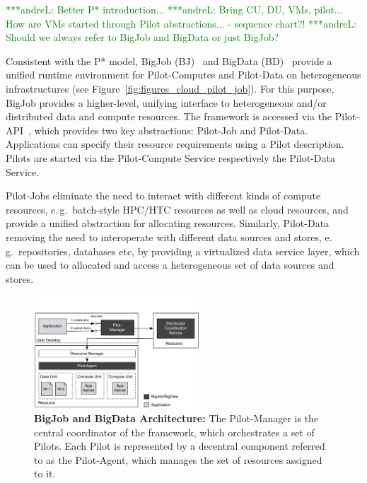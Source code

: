 \documentclass[times]{cpeauth}
\newcommand{\alnote}[1]{ {\textcolor{green} { ***andreL: #1 }}}
\newcommand{\alnote}[1]{}
\newcommand{\pilot}{Pilot\xspace}
\newcommand{\pilots}{Pilots\xspace}
\newcommand{\pilotjob}{Pilot-Job\xspace}
\newcommand{\pilotjobs}{Pilot-Jobs\xspace}
\newcommand{\pilotcomputes}{Pilot-Computes\xspace}
\newcommand{\pilotdata}{Pilot-Data\xspace}
\newcommand{\pilotdataservice}{Pilot-Data Service\xspace}
\newcommand{\pilotcomputeservice}{Pilot-Compute Service\xspace}
\newcommand{\upp}{\vspace*{-0.5em}}
\begin{document}
\alnote{Better P* introduction...}
\alnote{Bring CU, DU, VMs, pilot... How are VMs started through Pilot 
abstractions... - sequence chart?!}
\alnote{Should we always refer to BigJob and BigData or just BigJob?}

Consistent with the P* model, BigJob (BJ)~\cite{saga_bigjob_condor_cloud} and
BigData (BD)~\cite{Mantha:2012:PEF:2287016.2287020} provide a unified runtime
environment for \pilotcomputes and \pilotdata on heterogeneous infrastructures
(see Figure~\ref{fig:figures_cloud_pilot_job}). For this purpose, BigJob
provides a higher-level, unifying interface to heterogeneous and/or
distributed data and compute resources. The framework is accessed via the
\pilot-API~\cite{pilot_api}, which provides two key abstractions: \pilotjob 
and \pilotdata. Applications can specify their resource requirements using a
\pilot description. \pilots are started via the \pilotcomputeservice
respectively the \pilotdataservice.

\pilotjobs eliminate the need to interact with different kinds of compute 
resources, e.\,g.\ batch-style HPC/HTC resources as well as cloud resources, 
and provide a unified abstraction for allocating resources. Similarly, 
\pilotdata removing the need to interoperate with different data sources and 
stores, e.\,g.\ repositories, databases etc, by providing a virtualized data 
service layer, which can be used to allocated and access a heterogeneous set 
of data sources and stores.

\begin{figure}
	\upp	\upp	\upp
	\centering
	\includegraphics[width=0.55\textwidth]{figures/bigjob-bigdata-architecture.pdf}
	\caption{\textbf{BigJob and BigData Architecture:} The \pilot-Manager is 
	the central coordinator of the framework, which orchestrates a set of 
	\pilots. Each \pilot is represented by a decentral component referred to 
	as the \pilot-Agent, which manages the set of resources assigned to it. }
	\label{fig:figures_bigjob-bigdata-architecture}
\end{figure}
\end{document}
